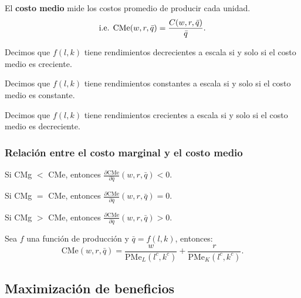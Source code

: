 \documentclass[8pt,a4paper]{extarticle}
\begin{document}
\begin{multicols}{3}
	\begin{boxdef}
		El \textbf{costo medio} mide los costos promedio de producir cada unidad.
		\[
			\text{\normalfont i.e. CMe} (w, r, \bar{q}) = \frac{C(w, r, \bar{q})}{\bar{q}}
			.\]
	\end{boxdef}

	\begin{boxprop}
		Decimos que $f(l, k)$ tiene rendimientos decrecientes a escala si y solo si el costo medio es creciente.
	\end{boxprop}

	\begin{boxprop}
		Decimos que $f(l, k)$ tiene rendimientos constantes a escala si y solo si el costo medio es constante.
	\end{boxprop}

	\begin{boxprop}
		Decimos que $f(l, k)$ tiene rendimientos crecientes a escala si y solo si el costo medio es decreciente.
	\end{boxprop}

	\subsubsection*{Relación entre el costo marginal y el costo medio}

	\begin{eqlist}
		\item Si CMg $<$ CMe, entonces $\displaystyle \frac{\partial \text{CMe}}{\partial \bar{q}} (w, r, \bar{q}) < 0$.
		\item Si CMg $=$ CMe, entonces $\displaystyle \frac{\partial \text{CMe}}{\partial \bar{q}} (w, r, \bar{q}) = 0$.
		\item Si CMg $>$ CMe, entonces $\displaystyle \frac{\partial \text{CMe}}{\partial \bar{q}} (w, r, \bar{q}) > 0$.
	\end{eqlist}

	\begin{boxcor}
		Sea $f$ una función de producción y $\bar{q} = f(l, k)$, entonces:
		\[
			\text{CMe} (w, r, \bar{q}) = \frac{w}{\text{PMe}_L (l^c, k^c)} + \frac{r}{\text{PMe}_K (l^c, k^c)}
			.\]
	\end{boxcor}

	\newpage

	\subsection{Maximización de beneficios}


\end{multicols}
\end{document}
